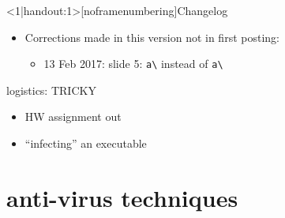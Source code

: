 \begin{frame}
    \titlepage
\end{frame}

{
\begin{frame}<1|handout:1>[noframenumbering]{Changelog}
    \begin{itemize}
        \item Corrections made in this version not in first posting:
        \begin{itemize}
        \item 13 Feb 2017: slide 5: {\tt a\textbackslash*} instead of {\tt a\textbackslash}
        \end{itemize}
    \end{itemize}
\end{frame}
}

\begin{frame}{logistics: TRICKY}
    \begin{itemize}
    \item HW assignment out
    \item ``infecting'' an executable
    \end{itemize}
\end{frame}

\section{anti-virus techniques}

